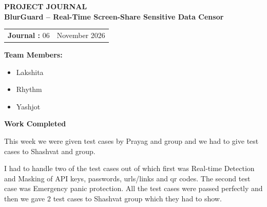 \documentclass[12pt,a4paper]{article}
\begin{document}

\begin{center}
    {\Large \textbf{PROJECT JOURNAL }}\\[10pt]

    {\large \textbf{BlurGuard -- Real-Time Screen-Share Sensitive Data Censor}}
\end{center}

\vspace{10pt}


\begin{tabular}{@{}p{}p{}@{}}
\textbf{Journal :} 06 &
\raggedleft \textbf{} November 2026
\end{tabular}

\vspace{12pt}


\textbf{Team Members:}

\begin{itemize}[leftmargin=1.5cm]
    \item Lakshita
    \item Rhythm
    \item Yashjot
\end{itemize}

\vspace{5pt}


\textbf{\large Work Completed}

\vspace{4pt}
This week we were given test cases by Prayag and group and we had to give test cases to Shashvat and group.

I had to handle two of the test cases out of which first was Real-time Detection and Masking of API keys, passwords, urls/links and qr codes. The second test case was Emergency panic protection. All the test cases were passed perfectly and then we gave 2 test cases to Shashvat group which they had to show.

\vspace{8pt}
\end{document}
